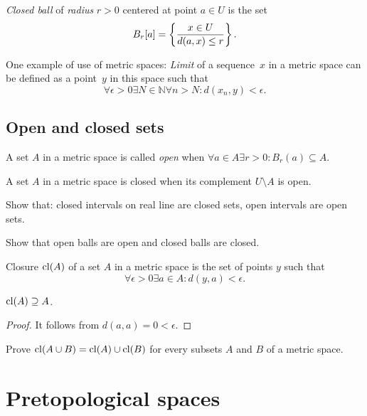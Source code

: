 \begin{defn}
\emph{Closed ball} of \emph{radius} $r>0$ centered
at point $a\in U$ is the set
\[
B_{r}[a]=\left\{ \frac{x\in U}{d(a,x)\le r}\right\}.
\]
\end{defn}

One example of use of metric spaces: \emph{Limit} of a sequence~$x$ in a metric space
can be defined as a point~$y$ in this space such that
\[ \forall \epsilon > 0 \exists N\in\mathbb{N} \forall n>N: d(x_n,y) < \epsilon. \]

\subsection{Open and closed sets}
\begin{defn}
A set $A$ in a metric space is called
\emph{open} when $\forall a\in A\exists r>0:B_{r}(a)\subseteq A$.
\end{defn}

\begin{defn}
A set $A$ in a metric space is
closed when its complement $U\setminus A$ is open.
\end{defn}

\begin{xca}
Show that: closed intervals on real line are closed sets, open intervals are open sets.
\end{xca}

\begin{xca}
Show that open balls are open and closed balls are closed.
\end{xca}

\begin{defn}
Closure $\operatorname{cl}(A)$ of a set $A$ in
a metric space is the set of points $y$ such that
\[
\forall\epsilon>0\exists a\in A:d(y,a)<\epsilon.
\]
\end{defn}
\begin{prop}
$\operatorname{cl}(A)\supseteq A$.\end{prop}
\begin{proof}
It follows from $d(a,a)=0<\epsilon$.\end{proof}
\begin{xca}
Prove $\operatorname{cl}(A\cup B)=\operatorname{cl}(A)\cup\operatorname{cl}(B)$ for every subsets $A$ and
$B$ of a metric space.
\end{xca}

\section{Pretopological spaces}

